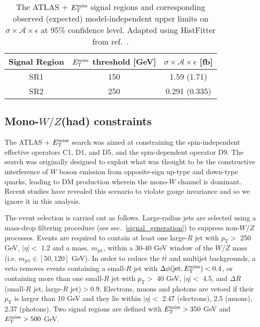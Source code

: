 \begin{table}[!htbp]
  \begin{center}
    \begin{tabular}{c|c|c}
      \hline
      \hline
      Signal Region & $E_{\mathrm{T}}^{\mathrm{miss}}$ threshold [GeV] & $\sigma \times \mathcal{A} \times \epsilon$ [fb] \\
      \hline
      SR1 & 150 & 1.59 (1.71) \\
      SR2 & 250 & 0.291 (0.335) \\
      \hline
      \hline
    \end{tabular}
  \end{center}
  \caption{The ATLAS \monoZ + $E_{\mathrm{T}}^{\mathrm{miss}}$ signal regions and corresponding observed (expected) model-independent upper limits on $\sigma \times \mathcal{A} \times \epsilon$ at 95\% confidence level. Adapted using HistFitter from ref.~\cite{Aad:2014monoZlep}.}
  \label{tab:sigmalim_monoZ}
\end{table}

\subsection{Mono-$W/Z$(had) constraints}
\label{monoWZ_constraints}

The ATLAS \monoWZ + $E_{\mathrm{T}}^{\mathrm{miss}}$ search \cite{Aad:2013monoWZ} was aimed at constraining the spin-independent effective operators C1, D1, and D5, and the spin-dependent operator D9. The search was originally designed to exploit what was thought to be the constructive interference of $W$ boson emission from opposite-sign up-type and down-type quarks, leading to DM production wherein the mono-$W$ channel is dominant. Recent studies \cite{Bell:gaugeInv} have revealed this scenario to violate gauge invariance and so we ignore it in this analysis.

The \monoWZ event selection is carried out as follows. Large-radius jets are selected using a mass-drop filtering procedure (see sec.~\ref{signal_generation}) to suppress non-$W/Z$ processes. Events are required to contain at least one large-$R$ jet with $p_{\mathrm{T}} >$ 250 GeV, $|\eta| <$ 1.2 and a mass, $m_{\mathrm{jet}}$, within a 30-40 GeV window of the $W/Z$ mass (i.e. $m_{\mathrm{jet}} \in [50, 120]$ GeV). In order to reduce the $t \bar{t}$ and multijet backgrounds, a veto removes events containing a small-$R$ jet with $\Delta\phi(\mathrm{jet},E_{\mathrm{T}}^{\mathrm{miss}})< 0.4$, or containing more than one small-$R$ jet with $p_{\mathrm{T}} >$ 40 GeV, $|\eta| <$ 4.5, and $\Delta R$(small-$R$ jet, large-$R$ jet)$>0.9$. Electrons, muons and photons are vetoed if their $p_{\mathrm{T}}$ is larger than 10 GeV and they lie within $|\eta| <$ 2.47 (electrons), 2.5 (muons), 2.37 (photons). Two signal regions are defined with $E_{\mathrm{T}}^{\mathrm{miss}} > 350$ GeV and $E_{\mathrm{T}}^{\mathrm{miss}} > 500$ GeV.


